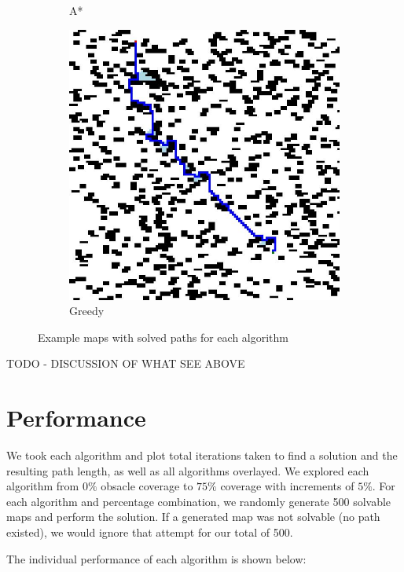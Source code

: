 \documentclass{article}
\begin{document}
\begin{figure}[H]
\begin{subfigure}{0.325\textwidth}
        \caption{A*}
    \end{subfigure}
    \begin{subfigure}{0.325\textwidth}
        \centering
        \includegraphics[width = \textwidth]{images/greedy.jpg}
        \caption{Greedy}
    \end{subfigure}
    \caption{Example maps with solved paths for each algorithm}
    \label{fig:example-maps}
\end{figure}

TODO - DISCUSSION OF WHAT SEE ABOVE

\section*{Performance}

We took each algorithm and plot total iterations taken to find a solution and the resulting path length, as well as all algorithms overlayed. We explored each algorithm from $0\%$ obsacle coverage to $75\%$ coverage with increments of $5\%$. For each algorithm and percentage combination, we randomly generate 500 solvable maps and perform the solution. If a generated map was not solvable (no path existed), we would ignore that attempt for our total of 500.

The individual performance of each algorithm is shown below:
\end{document}
